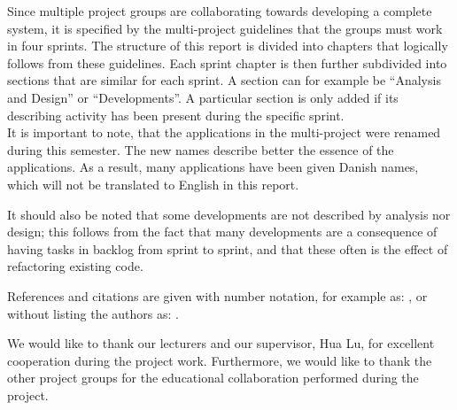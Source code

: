 Since multiple project groups are collaborating towards developing a complete system, it is specified by the multi-project guidelines that the groups must work in four sprints.
The structure of this report is divided into chapters that logically follows from these guidelines.
Each sprint chapter is then further subdivided into sections that are similar for each sprint.
A section can for example be ``Analysis and Design'' or ``Developments''.
A particular section is only added if its describing activity has been present during the specific sprint.\\

It is important to note, that the applications in the multi-project were renamed during this semester.
The new names describe better the essence of the applications.
As a result, many applications have been given Danish names, which will not be translated to English in this report.

It should also be noted that some developments are not described by analysis nor design; this follows from the fact that many developments are a consequence of having tasks in backlog from sprint to sprint, and that these often is the effect of refactoring existing code.

References and citations are given with number notation, for example as: \citet{launcher2011}, or without listing the authors as: \cite{launcher2011}. 

We would like to thank our lecturers and our supervisor, Hua Lu, for excellent cooperation during the project work.
Furthermore, we would like to thank the other project groups for the educational collaboration performed during the project.
